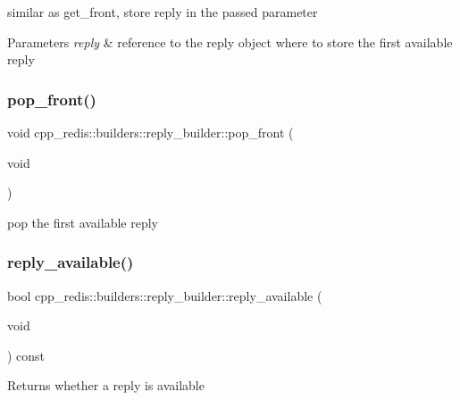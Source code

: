 similar as get\+\_\+front, store reply in the passed parameter


\begin{DoxyParams}{Parameters}
{\em reply} & reference to the reply object where to store the first available reply \\
\hline
\end{DoxyParams}
\mbox{\label{classcpp__redis_1_1builders_1_1reply__builder_a0b5fb8dd4fc87c508e0a45647bc86b16}} 
\subsubsection{\texorpdfstring{pop\+\_\+front()}{pop\_front()}}
{\footnotesize\ttfamily void cpp\+\_\+redis\+::builders\+::reply\+\_\+builder\+::pop\+\_\+front (\begin{DoxyParamCaption}\item[{void}]{ }\end{DoxyParamCaption})}

pop the first available reply \mbox{\label{classcpp__redis_1_1builders_1_1reply__builder_af7d8e764ab591390cd1eae8801cd691c}} 
\subsubsection{\texorpdfstring{reply\+\_\+available()}{reply\_available()}}
{\footnotesize\ttfamily bool cpp\+\_\+redis\+::builders\+::reply\+\_\+builder\+::reply\+\_\+available (\begin{DoxyParamCaption}\item[{void}]{ }\end{DoxyParamCaption}) const}

\begin{DoxyReturn}{Returns}
whether a reply is available 
\end{DoxyReturn}


